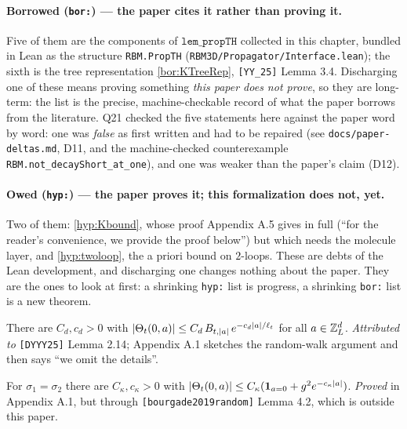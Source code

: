 \paragraph{Borrowed (\texttt{bor:}) --- the paper cites it rather than proving it.}
Five of them are the components of $\mathtt{lem\_propTH}$ collected in this chapter,
bundled in Lean as the structure \texttt{RBM.PropTH}
(\texttt{RBM3D/Propagator/Interface.lean}); the sixth is the tree representation
\ref{bor:KTreeRep}, \texttt{[YY\_25]} Lemma 3.4.  Discharging one of these means proving
something \emph{this paper does not prove}, so they are long-term: the list is the precise,
machine-checkable record of what the paper borrows from the literature.  Q21 checked the
five statements here against the paper word by word: one was \emph{false} as first written
and had to be repaired (see \texttt{docs/paper-deltas.md}, D11, and the machine-checked
counterexample \texttt{RBM.not\_decayShort\_at\_one}), and one was weaker than the paper's
claim (D12).

\paragraph{Owed (\texttt{hyp:}) --- the paper proves it; this formalization does not, yet.}
Two of them: \ref{hyp:Kbound}, whose proof Appendix A.5 gives in full (``for the reader's
convenience, we provide the proof below'') but which needs the molecule layer, and
\ref{hyp:twoloop}, the a priori bound on $2$-loops.  These are debts of the Lean
development, and discharging one changes nothing about the paper.  They are the ones to
look at first: a shrinking \texttt{hyp:} list is progress, a shrinking \texttt{bor:} list
is a new theorem.

\begin{theorem}\label{bor:ThfadC}
  There are $C_d,c_d>0$ with
  $|\Theta_t(0,a)|\le C_d\,B_{t,|a|}\,e^{-c_d|a|/\ell_t}$ for all $a\in\mathbb{Z}_L^d$.
  \emph{Attributed to} \texttt{[DYYY25]} Lemma 2.14; Appendix A.1 sketches the
  random-walk argument and then says ``we omit the details''.
\end{theorem}

\begin{theorem}\label{bor:ThfadCshort}
  For $\sigma_1=\sigma_2$ there are $C_\kappa,c_\kappa>0$ with
  $|\Theta_t(0,a)|\le C_\kappa(\mathbf 1_{a=0}+g^2e^{-c_\kappa|a|})$.
  \emph{Proved} in Appendix A.1, but through \texttt{[bourgade2019random]} Lemma 4.2,
  which is outside this paper.
\end{theorem}

